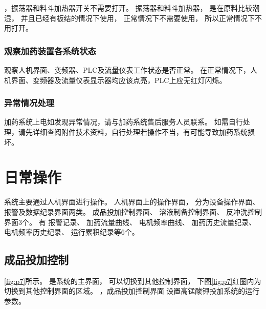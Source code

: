 \documentclass[UTF8,a4paper,12pt,titlepage]{ctexart}
\begin{document}
      ，振荡器和料斗加热器开关不需要打开。
      振荡器和料斗加热器，
      是在原料比较潮湿，
      并且已经有板结的情况下使用，
      正常情况下不需要使用，
      所以正常情况下不用打开。

      \subsubsection{观察加药装置各系统状态}
      观察人机界面、变频器、PLC及流量仪表工作状态是否正常。
      在正常情况下，人机界面、变频器及流量仪表显示器均应该点亮，PLC上应无红灯闪烁。

      \subsubsection{异常情况处理}
      加药系统上电如发现异常情况，请与加药系统售后服务人员联系。
      如需自行处理，请先详细查阅附件技术资料，自行处理若操作不当，有可能导致加药系统损坏。

\newpage %

\section{日常操作}\label{sec:sg3}
   系统主要通过人机界面进行操作。
      人机界面上的操作界面，
      分为设备操作界面、报警及数据纪录界面两类。
      成品投加控制界面、
      溶液制备控制界面、
      反冲洗控制界面3个。
       有
      报警记录、
      加药流量曲线、
      电机频率曲线、
      加药历史流量纪录、
      电机频率历史纪录、
      运行累积纪录等6个。

   \subsection{成品投加控制}

      \ref{fig:p7}所示。
      是系统的主界面，
      可以切换到其他控制界面，
      下图\ref{fig:p7}红圈内为切换到其他控制界面的区域。
      ，成品投加控制界面
      设置高锰酸钾投加系统的运行参数。
\end{document}
